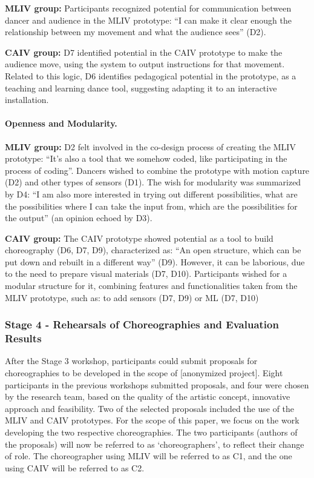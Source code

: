 \textbf{MLIV group:} Participants recognized potential for communication between dancer and audience in the MLIV prototype: “I can make it clear enough the relationship between my movement and what the audience sees” (D2).

\textbf{CAIV group:} D7 identified potential in the CAIV prototype to make the audience move, using the system to output instructions for that movement. Related to this logic, D6 identifies pedagogical potential in the prototype, as a teaching and learning dance tool, suggesting adapting it to an interactive installation.

\paragraph{Openness and Modularity. }

\textbf{MLIV group: }D2 felt involved in the co-design process of creating the MLIV prototype: “It’s also a tool that we somehow coded, like participating in the process of coding”. Dancers wished to combine the prototype with motion capture (D2) and other types of sensors (D1). The wish for modularity was summarized by D4: “I am also more interested in trying out different possibilities, what are the possibilities where I can take the input from, which are the possibilities for the output” (an opinion echoed by D3).

\textbf{CAIV group:} The CAIV prototype showed potential as a tool to build choreography (D6, D7, D9), characterized as: “An open structure, which can be put down and rebuilt in a different way” (D9). However, it can be laborious, due to the need to prepare visual materials (D7, D10). Participants wished for a modular structure for it, combining features and functionalities taken from the MLIV prototype, such as: to add sensors (D7, D9) or ML (D7, D10)

\subsubsection{Stage 4 - Rehearsals of Choreographies and Evaluation Results}

After the Stage 3 workshop, participants could submit proposals for choreographies to be developed in the scope of [anonymized project]. Eight participants in the previous workshops submitted proposals, and four were chosen by the research team, based on the quality of the artistic concept, innovative approach and feasibility. Two of the selected proposals included the use of the MLIV and CAIV prototypes. For the scope of this paper, we focus on the work developing the two respective choreographies. The two participants (authors of the proposals) will now be referred to as ‘choreographers’, to reflect their change of role. The choreographer using MLIV will be referred to as C1, and the one using CAIV will be referred to as C2.  


